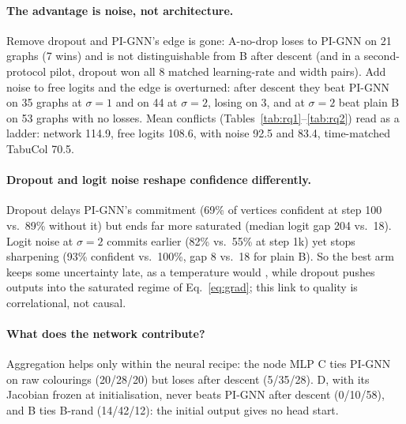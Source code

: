 \documentclass[11pt]{article}
\begin{document}
\paragraph{The advantage is noise, not architecture.} Remove dropout and
PI-GNN's edge is gone: A-no-drop loses to PI-GNN on 21 graphs (7 wins) and is
not distinguishable from B after descent (and in a second-protocol pilot,
dropout won all 8 matched learning-rate and width pairs). Add noise to free
logits and the edge is overturned: after descent
they beat PI-GNN on 35 graphs at $\sigma=1$ and on 44 at $\sigma=2$, losing on
3, and at $\sigma=2$ beat plain B on 53 graphs with no losses. Mean conflicts
(Tables~\ref{tab:rq1}--\ref{tab:rq2}) read as a ladder: network 114.9, free
logits 108.6, with noise 92.5 and 83.4, time-matched TabuCol 70.5.

\paragraph{Dropout and logit noise reshape confidence differently.} Dropout
delays PI-GNN's commitment (69\% of vertices confident at step 100 vs.\ 89\%
without it) but ends far more saturated (median logit gap 204 vs.\ 18). Logit
noise at $\sigma=2$ commits earlier (82\% vs.\ 55\% at step 1k) yet stops
sharpening (93\% confident vs.\ 100\%, gap 8 vs.\ 18 for plain B). So the best
arm keeps some uncertainty late, as a temperature would
\citep{kirkpatrick1983annealing,peterson1989potts}, while dropout pushes
outputs into the saturated regime of Eq.~\ref{eq:grad}; this link to quality
is correlational, not causal.

\paragraph{What does the network contribute?} Aggregation helps only within
the neural recipe: the node MLP C ties PI-GNN on raw colourings (20/28/20) but
loses after descent (5/35/28). D, with its Jacobian frozen at initialisation,
never beats PI-GNN after descent (0/10/58), and B ties B-rand (14/42/12): the
initial output gives no head start.
\end{document}
